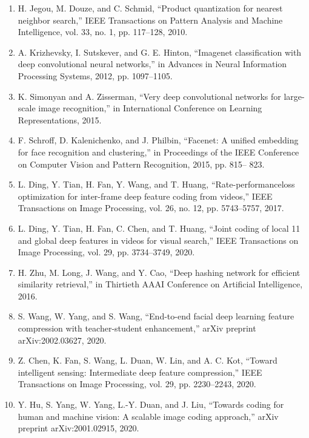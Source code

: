 \documentclass{article}
\begin{document}
\begin{enumerate}
	\item H. Jegou, M. Douze, and C. Schmid, “Product quantization for nearest
	neighbor search,” IEEE Transactions on Pattern Analysis and Machine
	Intelligence, vol. 33, no. 1, pp. 117–128, 2010.

	\item A. Krizhevsky, I. Sutskever, and G. E. Hinton, “Imagenet classification
	with deep convolutional neural networks,” in Advances in Neural Information Processing Systems, 2012, pp. 1097–1105.

	\item K. Simonyan and A. Zisserman, “Very deep convolutional networks for
	large-scale image recognition,” in International Conference on Learning
	Representations, 2015.

	\item F. Schroff, D. Kalenichenko, and J. Philbin, “Facenet: A unified embedding for face recognition and clustering,” in Proceedings of the IEEE
	Conference on Computer Vision and Pattern Recognition, 2015, pp. 815–
	823.

	\item L. Ding, Y. Tian, H. Fan, Y. Wang, and T. Huang, “Rate-performanceloss optimization for inter-frame deep feature coding from videos,” IEEE
	Transactions on Image Processing, vol. 26, no. 12, pp. 5743–5757, 2017.

	\item L. Ding, Y. Tian, H. Fan, C. Chen, and T. Huang, “Joint coding of local
	11
	and global deep features in videos for visual search,” IEEE Transactions
	on Image Processing, vol. 29, pp. 3734–3749, 2020.

	\item H. Zhu, M. Long, J. Wang, and Y. Cao, “Deep hashing network for
	efficient similarity retrieval,” in Thirtieth AAAI Conference on Artificial
	Intelligence, 2016.

	\item S. Wang, W. Yang, and S. Wang, “End-to-end facial deep learning
	feature compression with teacher-student enhancement,” arXiv preprint
	arXiv:2002.03627, 2020.

	\item Z. Chen, K. Fan, S. Wang, L. Duan, W. Lin, and A. C. Kot, “Toward
	intelligent sensing: Intermediate deep feature compression,” IEEE Transactions on Image Processing, vol. 29, pp. 2230–2243, 2020.

	\item Y. Hu, S. Yang, W. Yang, L.-Y. Duan, and J. Liu, “Towards coding for
	human and machine vision: A scalable image coding approach,” arXiv
	preprint arXiv:2001.02915, 2020.


\end{enumerate}
\end{document}
